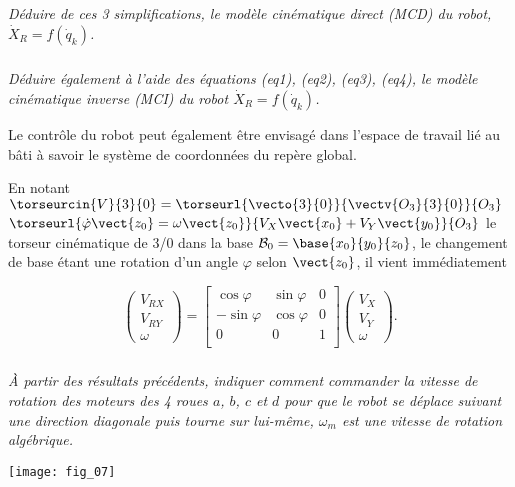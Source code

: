 \subparagraph{}
\textit{Déduire de ces 3 simplifications, le modèle cinématique direct (MCD) du robot, $\dot{X}_R = f\left(\dot{q}_k \right)$.}
\ifprof%
\begin{corrige}
\end{corrige}\else\fi

\subparagraph{}
\textit{Déduire également à l'aide des équations (eq1), (eq2), (eq3), (eq4), le modèle cinématique inverse (MCI) du robot 
$\dot{X}_R = f\left(\dot{q}_k \right)$.}
\ifprof%
\begin{corrige}
\end{corrige}\else\fi




Le contrôle du robot peut également être envisagé dans l'espace de travail lié au bâti à savoir le système de coordonnées du repère global.

En notant $\torseurcin{V}{3}{0}= \torseurl{\vecto{3}{0}}{\vectv{O_3}{3}{0}}{O_3}$ 
$\torseurl{\dot{\varphi}\vect{z_0}=\omega\vect{z_0}}{V_X\vect{x_0}+V_Y\vect{y_0}}{O_3}$ 
le torseur cinématique de 3/0 dans la base $\mathcal{B}_0=\base{x_0}{y_0}{z_0}$,
le changement de base étant une rotation d'un angle $\varphi$ selon $\vect{z_0}$, il vient immédiatement

$$
\begin{pmatrix} V_{RX} \\ V_{RY} \\ \omega \end{pmatrix}
=
\begin{bmatrix}  
\cos \varphi  &  \sin \varphi & 0 \\
- \sin \varphi & \cos \varphi & 0 \\
0 &  0 & 1 \\
\end{bmatrix}
\begin{pmatrix}
V_X \\ V_Y \\ \omega
\end{pmatrix}.
$$

\subparagraph{}
\textit{À partir des résultats précédents, indiquer comment commander la vitesse de rotation des moteurs des 4 roues $a$, $b$, $c$ et $d$ pour que le robot se déplace suivant une direction diagonale puis tourne sur lui-même, $\omega_m$ est une vitesse de rotation algébrique.}
\ifprof%
\begin{corrige}
\end{corrige}\else\fi

\begin{center}
\texttt{[image: fig\_07]}
\end{center}




